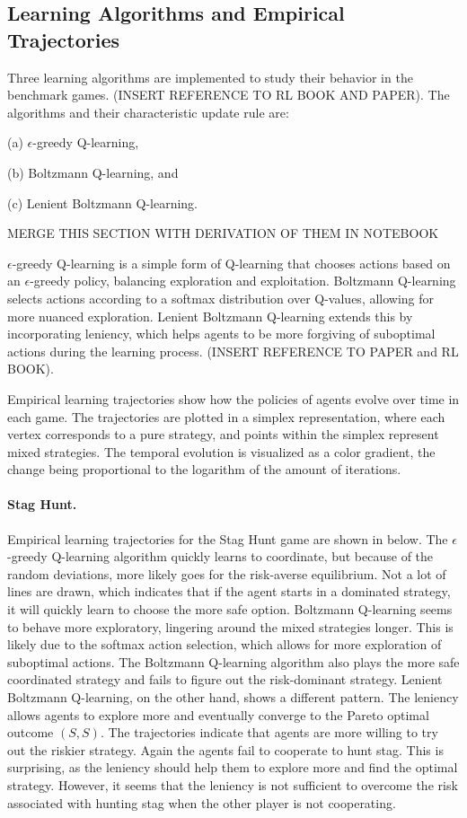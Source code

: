 \subsection{Learning Algorithms and Empirical Trajectories}
Three learning algorithms are implemented to study their behavior in the benchmark games. (INSERT REFERENCE TO RL BOOK AND PAPER). The algorithms and their characteristic update rule are: 

(a) $\epsilon$-greedy Q-learning, 

(b) Boltzmann Q-learning, and 

(c) Lenient Boltzmann Q-learning. 

MERGE THIS SECTION WITH DERIVATION OF THEM IN NOTEBOOK

$\epsilon$-greedy Q-learning is a simple form of Q-learning that chooses actions based on an $\epsilon$-greedy policy, balancing exploration and exploitation. Boltzmann Q-learning selects actions according to a softmax distribution over Q-values, allowing for more nuanced exploration. Lenient Boltzmann Q-learning extends this by incorporating leniency, which helps agents to be more forgiving of suboptimal actions during the learning process. (INSERT REFERENCE TO PAPER and RL BOOK).


Empirical learning trajectories show how the policies of agents evolve over time in each game. The trajectories are plotted in a simplex representation, where each vertex corresponds to a pure strategy, and points within the simplex represent mixed strategies. The temporal evolution is visualized as a color gradient, the change being proportional to the logarithm of the amount of iterations.

\paragraph{Stag Hunt.}

Empirical learning trajectories for the Stag Hunt game are shown in below. The $\epsilon$-greedy Q-learning algorithm quickly learns to coordinate, but because of the random deviations, more likely goes for the risk-averse equilibrium. Not a lot of lines are drawn, which indicates that if the agent starts in a dominated strategy, it will quickly learn to choose the more safe option. Boltzmann Q-learning seems to behave more exploratory, lingering around the mixed strategies longer. This is likely due to the softmax action selection, which allows for more exploration of suboptimal actions. The Boltzmann Q-learning algorithm also plays the more safe coordinated strategy and fails to figure out the risk-dominant strategy. Lenient Boltzmann Q-learning, on the other hand, shows a different pattern. The leniency allows agents to explore more and eventually converge to the Pareto optimal outcome $(S,S)$. The trajectories indicate that agents are more willing to try out the riskier strategy. Again the agents fail to cooperate to hunt stag. This is surprising, as the leniency should help them to explore more and find the optimal strategy. However, it seems that the leniency is not sufficient to overcome the risk associated with hunting stag when the other player is not cooperating.

